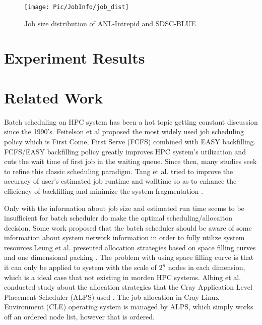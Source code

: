 \documentclass[conference]{IEEEtran}
\begin{document}
\begin{figure}[h!] 
  \centering
  \texttt{[image: Pic/JobInfo/job\_dist]}
   \caption{Job size distribution of ANL-Intrepid and SDSC-BLUE }
   \label{fig:jobsizeintowtraces}
\end{figure}


\section{Experiment Results}
\label{sec:scheduling results}



\fi


\section{Related Work}
\label{sec:related_work}
Batch scheduling on HPC system has been a hot topic getting constant discussion since the 1990's.
Feitelson et al proposed the most widely used job scheduling policy which is First Come, First Serve (FCFS) combined with 
EASY backfilling\cite{feit}. FCFS/EASY backfilling policy greatly improves HPC system's utilization and cuts the wait time 
of first job in the waiting queue. Since then, many studies seek to refine this classic scheduling paradigm. Tang et al. 
tried to improve the accuracy of user's estimated job runtime and walltime so as to enhance the efficiency of backfilling and  minimize the system fragmentation\cite{wei-ipdps2010} \cite{wei-jpdc2013} \cite{wei-ipdps2011}. %


Only with the information about job size and estimated run time seems to be insufficient for batch scheduler do make the 
optimal scheduling/allocaiton decision. Some work proposed that the batch scheduler should be aware of some information 
about system network information in order to fully utilize system resources.Leung et al. presented allocation strategies 
based on space filling curves and one dimensional packing \cite{leung}. The problem with using space filling curve is that  
it can only be applied to system with the scale of $2^n$ nodes in each dimension, which is a ideal case that not existing 
in morden HPC systems. Albing et al. conducted study about the allocation strategies that the Cray
Application Level Placement Scheduler (ALPS) used \cite{carl-cug}. The job allocation in Cray Linux Environment (CLE) 
operating system is managed by ALPS, which simply works off an ordered node list, however that is ordered. 
\end{document}
